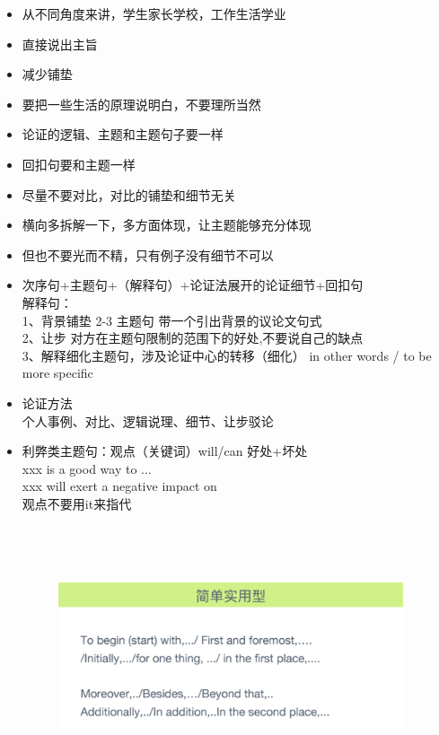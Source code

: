 \documentclass[UTF8]{ctexart}
\begin{document}
\begin{enumerate}[A]
\begin{itemize}
\begin{itemize}
        \item 从不同角度来讲，学生家长学校，工作生活学业
        \item 直接说出主旨
        \item 减少铺垫
        \item 要把一些生活的原理说明白，不要理所当然
        \item 论证的逻辑、主题和主题句子要一样
        \item 回扣句要和主题一样
        \item 尽量不要对比，对比的铺垫和细节无关
        \item 横向多拆解一下，多方面体现，让主题能够充分体现
        \item 但也不要光而不精，只有例子没有细节不可以
        \item 次序句+主题句+（解释句）+论证法展开的论证细节+回扣句\\
        解释句：\\
        1、背景铺垫 2-3 主题句 带一个引出背景的议论文句式\\
        2、让步 对方在主题句限制的范围下的好处,不要说自己的缺点\\
        3、解释细化主题句，涉及论证中心的转移（细化） in other words / to be more specific\\
        \item 论证方法\\
        个人事例、对比、逻辑说理、细节、让步驳论\\
        \item 利弊类主题句：观点（关键词）will/can 好处+坏处\\
        xxx is a good way to ...\\
        xxx will exert a negative impact on\\
        观点不要用it来指代 \\
                    \begin{figure}[!htp]
        \centering
        \includegraphics[width=4.00in,height=3.00in]{xiezuo8.png}

\end{figure}
\end{itemize}
\end{itemize}
\end{enumerate}
\end{document}
